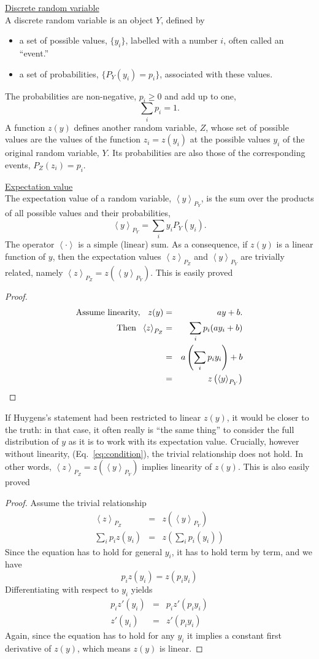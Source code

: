 \documentclass[pdftex]{article}
\newcommand{\ave}[1]{\left\langle#1 \right\rangle}
\newcommand{\bi}{\begin{itemize}}
\newcommand{\ei}{\end{itemize}}
\newcommand{\elabel}[1]{\label{eq:#1}}
\newcommand{\eref}[1]{(Eq.~\ref{eq:#1})}
\newcommand{\be}{\begin{equation}}
\newcommand{\ee}{\end{equation}}
\newcommand{\bea}{\begin{eqnarray}}
\newcommand{\eea}{\end{eqnarray}}
\begin{document}
\underline{Discrete random variable}\\
A discrete random variable is an object $Y$, defined by 
\bi
\item
a set of possible values, $\{y_i\}$, labelled with a number $i$, often called an ``event.'' 
\item
a set of probabilities, $\{P_Y(y_i)=p_i\}$, associated with these values.
\ei
The probabilities are non-negative, $p_i\geq0$ and add up to one,
\be
\sum_i p_i =1.
\ee
A function $z(y)$ defines another random variable, $Z$, whose set of possible values are the values of the function $z_i=z(y_i)$ at the possible values $y_i$ of the original random variable, $Y$. Its probabilities are also those of the corresponding events, $P_Z(z_i)=p_i$.

\underline{Expectation value}\\
The expectation value of a random variable, $\ave{y}_{P_Y}$, is the sum over the products of all possible values and their probabilities, 
\be
\ave{y}_{P_Y}=\sum_i y_i P_Y(y_i).
\ee
The operator $\ave{\cdot}$ is a simple (linear) sum. As a consequence, if $z(y)$ is a linear function of $y$, then the expectation values $\ave{z}_{P_Z}$ and
$\ave{y}_{P_Y}$ are trivially related, namely $\ave{z}_{P_Z}=z\left(\ave{y}_{P_Y}\right)$. 
This is easily proved
\begin{proof}
\bea
\text{Assume linearity, \hspace{.2cm}} z(y)&=&a y +b. \elabel{condition}\\
\text{Then \hspace{.1cm}}\ave{z}_{P_Z}&=& \sum_{i}p_i (a y_i + b)\\
&=&a \left(\sum_{i}p_i  y_i\right) + b\\
&=& z\left(\ave{y}_{P_Y}\right)
\eea
\end{proof}
If Huygens's statement had been restricted to linear $z(y)$, it would be closer to the truth: in that case, it often really is ``the same thing'' to consider the full distribution of $y$ as it is to work with its expectation value. 
Crucially, however without linearity, \eref{condition}, the trivial relationship does not hold. In other words, $\ave{z}_{P_Z}=z\left(\ave{y}_{P_Y}\right)$ implies linearity of $z(y)$. This is also easily proved
\begin{proof}
Assume the trivial relationship
\bea
\ave{z}_{P_Z}&=&z\left(\ave{y}_{P_Y}\right)\\
\sum_{i}p_i z(y_i) &=& z\left(\sum_{i}p_i(y_i) \right)
\eea
Since the equation has to hold for general $y_i$, it has to hold term by term, and we have
\be
p_i z(y_i) = z (p_i y_i)
\ee
Differentiating with respect to $y_i$ yields
\bea
p_i z'(y_i) &=& p_i z' (p_i y_i)\\
z'(y_i) &=& z' (p_i y_i)
\eea
Again, since the equation has to hold for any $y_i$ it implies a constant first derivative of $z(y)$, which means $z(y)$ is linear.
\end{proof}
\end{document}
